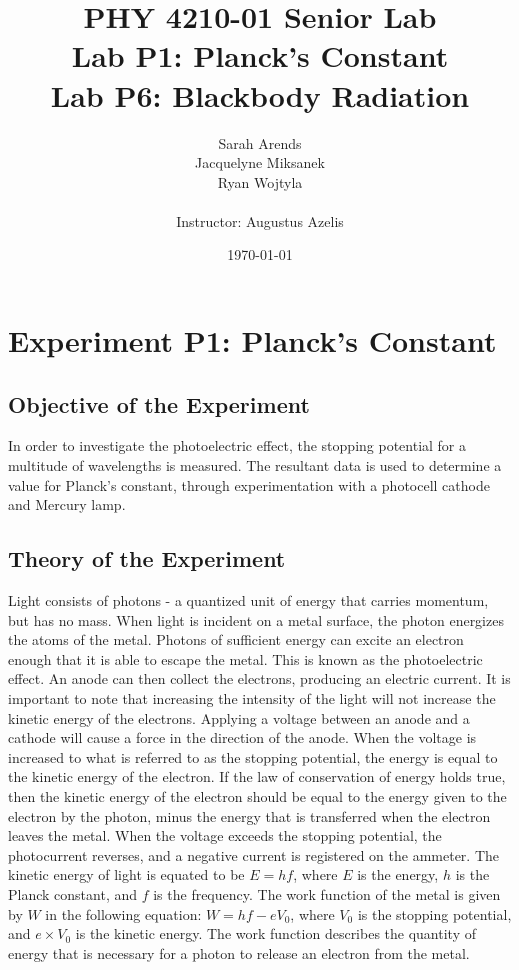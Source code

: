\documentclass[a4paper]{article}
\title{PHY 4210-01 Senior Lab \\Lab P1: Planck's Constant\\Lab P6: Blackbody Radiation}
\author{Sarah Arends \\
        Jacquelyne Miksanek \\
        Ryan Wojtyla \\ \\
        Instructor: Augustus Azelis}
\date{\today}
\begin{document}
\maketitle

\begin{abstract}
\qq 
\end{abstract}

\newpage

\tableofcontents

\newpage

\section{Experiment P1: Planck's Constant}

\subsection{Objective of the Experiment}
\qq In order to investigate the photoelectric effect, the stopping
potential for a multitude of wavelengths is measured. The resultant
data is used to determine a value for Planck's constant, through
experimentation with a photocell cathode and Mercury lamp.

\subsection{Theory of the Experiment}
\qq Light consists of photons - a quantized unit of energy that carries momentum, but has no mass. When
light is incident on a metal surface, the photon energizes the atoms of
the metal. Photons of sufficient energy can excite an electron enough that it is able to escape the metal. This
is known as the photoelectric effect. An anode can then collect the
electrons, producing an electric current. It is important to
note that increasing the intensity of the light will not increase the
kinetic energy of the electrons. Applying a voltage between an anode
and a cathode will cause a force in the direction of the anode. When the voltage
is increased to what is referred to as the stopping potential, the energy is equal to the kinetic energy of the electron. If the law of
conservation of energy holds true, then the kinetic energy of the
electron should be equal to the energy given to the electron by the
photon, minus the energy that is transferred when the electron leaves
the metal. When the voltage exceeds the stopping potential,
the photocurrent reverses, and a negative current is registered on the
ammeter. The kinetic energy of light is equated to be $E = hf$, where
$E$ is the energy, $h$ is the Planck constant, and $f$ is the
frequency. The work function of the metal is given by $W$ in the
following equation: $ W = h f - e V_0$, where $V_0$ is the
stopping potential, and $e \times V_0$ is the kinetic energy. The work
function describes the quantity of energy that is necessary for a
photon to release an electron from the metal.
\end{document}
